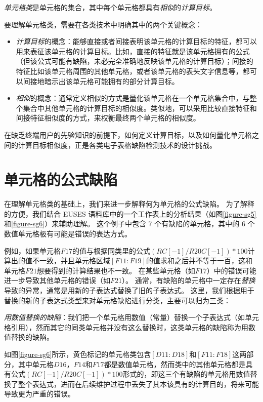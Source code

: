 \begin{definition}
    \textit{单元格类}是单元格的集合，其中每个单元格都具有\textit{相似}的\textit{计算目标}。
\end{definition}

要理解单元格类，需要在各类技术中明确其中的两个关键概念：
\begin{itemize}
    \item \textit{计算目标}的概念：能够直接或者间接表明该单元格的计算目标的特征，都可以用来表征该单元格的计算目标。比如，直接的特征就是该单元格拥有的公式（但该公式可能有缺陷，未必完全准确地反映该单元格的计算目标）；间接的特征比如该单元格周围的其他单元格，或者该单元格的表头文字信息等，都可以间接地暗示出该单元格可能拥有的部分计算目标。
    \item \textit{相似}的概念：通常定义相似的方式是量化该单元格在一个单元格集合中，与整个集合中其他单元格的计算目标的相似度。类似地，可以采用比较直接特征和间接特征相似度的方式，来权衡最终两个单元格的相似度。
\end{itemize}
在缺乏终端用户的先验知识的前提下，如何定义计算目标，以及如何量化单元格之间的计算目标相似度，正是各类电子表格缺陷检测技术的设计挑战。

\section{单元格的公式缺陷}

在理解单元格类的基础上，我们来进一步解释何为单元格的公式缺陷。
为了解释的方便，我们结合 EUSES 语料库中的一个工作表上的分析结果（如图\ref{figure-sg5}和\ref{figure-sg6}）来辅助理解。
这个例子中包含 7 个有缺陷的单元格，其中的 6 个数值单元格极有可能是错误的表达方式。

例如，如果单元格$F17$的值与根据同类里的公式$(RC[-1]/R20C[-1])*100$计算出的值不一致，并且单元格区域$[F11:F19]$的值求和之后并不等于一百，这和单元格$F21$想要得到的计算结果也不一致。
在某些单元格（如$F17$）中的错误可能进一步导致其他单元格的错误（如$F21$）。
通常，有缺陷的单元格中一定存在\textit{替换}导致的异常，通常是用新的子表达式替换了旧的子表达式。
这里，我们根据用于替换的新的子表达式类型来对单元格缺陷进行分类，主要可以归为三类：

\begin{definition}
   \textit{用数值替换的缺陷}：我们把一个单元格用数值（常量）替换一个子表达式（如单元格引用），然而其它的同类单元格并没有这么替换时，这类单元格的缺陷称为用数值替换的缺陷。
\end{definition}
如图\ref{figure-sg6}所示，黄色标记的单元格类包含$[D11:D18]$和$[F11:F18]$这两部分，其中单元格$D16$，$F14$和$F17$都是数值单元格，然而类中的其他单元格都是具有公式$(RC[-1]/R20C[-1])*100$形式的，即这三个有缺陷的单元格用数值替换了整个表达式，进而在后续维护过程中丢失了其本该具有的计算目的，将来可能导致更为严重的错误。

